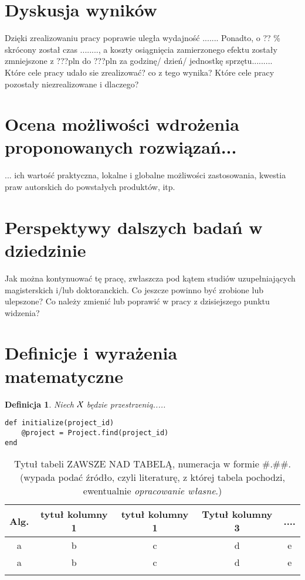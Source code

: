 \documentclass[twoside,12pt]{report}
\newtheorem{definition}{Definicja} %
\begin{document}
\section{Dyskusja wyników}
Dzięki zrealizowaniu pracy poprawie uległa wydajność ....... Ponadto, o ?? \%
skrócony został czas ........, a koszty osiągnięcia zamierzonego efektu zostały
zmniejszone z ???pln do ???pln za godzinę/ dzień/ jednostkę sprzętu.........\\
\indent Które cele pracy udało sie zrealizować? co z tego wynika? Które cele
pracy pozostały niezrealizowane i dlaczego? 

\section[Ocena możliwości wdrożenia...]{Ocena możliwości wdrożenia proponowanych
\newline rozwiązań...}
... ich wartość praktyczna, lokalne i globalne możliwości zastosowania, kwestia
praw autorskich do powstałych produktów, itp. 

\section{Perspektywy dalszych badań w dziedzinie}
Jak można kontynuować tę pracę, zwłaszcza pod kątem studiów
uzupełniających magisterskich i/lub doktoranckich. Co jeszcze powinno być
zrobione lub ulepszone? Co należy zmienić lub poprawić w pracy z dzisiejszego punktu widzenia?

\section{Definicje i wyrażenia matematyczne}
\begin{definition} \label{def.definicja1}
Niech $\cal X$ będzie przestrzenią.....
\end{definition}

\begin{lstlisting}[caption=blabla, label=amb]
def initialize(project_id)
    @project = Project.find(project_id)
end
\end{lstlisting}

\begin{table}[!t]
\centering
\caption{Tytuł tabeli ZAWSZE NAD TABELĄ, numeracja w formie \#.\#\#. (wypada podać źródło, czyli literaturę,
z której tabela pochodzi, ewentualnie {\em opracowanie własne}.)} 

\label{tabls1}

{\footnotesize 
\vspace{5mm}
\begin{tabular}{c c c c c}
\hline\noalign{\smallskip}
{\bf Alg.} & {\bf tytuł kolumny 1} & {\bf tytuł kolumny 1} & {\bf Tytuł kolumny
3} & {\bf ....}     \\

\hline\noalign{\smallskip}
a & b & c & d & e  \vspace{3mm} \\ 
\noalign{\smallskip}
 a & b & c & d & e \\

\noalign{\smallskip}
\end{tabular}
}
\end{table}
\end{document}
